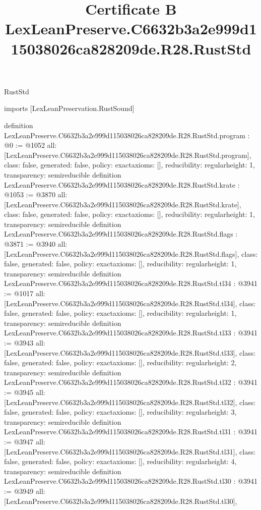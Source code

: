 \begin{lexlean}{RustStd}
\title{Certificate B LexLeanPreserve.C6632b3a2e999d115038026ca828209de.R28.RustStd}
\begin{coremodule}
imports [LexLeanPreservation.RustSound]

definition LexLeanPreserve.C6632b3a2e999d115038026ca828209de.R28.RustStd.program : @0 := @1052 {
  all: [LexLeanPreserve.C6632b3a2e999d115038026ca828209de.R28.RustStd.program],
  class: false,
  generated: false,
  policy: exact{axioms: []},
  reducibility: regular{height: 1},
  transparency: semireducible
}
definition LexLeanPreserve.C6632b3a2e999d115038026ca828209de.R28.RustStd.krate : @1053 := @3870 {
  all: [LexLeanPreserve.C6632b3a2e999d115038026ca828209de.R28.RustStd.krate],
  class: false,
  generated: false,
  policy: exact{axioms: []},
  reducibility: regular{height: 1},
  transparency: semireducible
}
definition LexLeanPreserve.C6632b3a2e999d115038026ca828209de.R28.RustStd.flags : @3871 := @3940 {
  all: [LexLeanPreserve.C6632b3a2e999d115038026ca828209de.R28.RustStd.flags],
  class: false,
  generated: false,
  policy: exact{axioms: []},
  reducibility: regular{height: 1},
  transparency: semireducible
}
definition LexLeanPreserve.C6632b3a2e999d115038026ca828209de.R28.RustStd.tl34 : @3941 := @1017 {
  all: [LexLeanPreserve.C6632b3a2e999d115038026ca828209de.R28.RustStd.tl34],
  class: false,
  generated: false,
  policy: exact{axioms: []},
  reducibility: regular{height: 1},
  transparency: semireducible
}
definition LexLeanPreserve.C6632b3a2e999d115038026ca828209de.R28.RustStd.tl33 : @3941 := @3943 {
  all: [LexLeanPreserve.C6632b3a2e999d115038026ca828209de.R28.RustStd.tl33],
  class: false,
  generated: false,
  policy: exact{axioms: []},
  reducibility: regular{height: 2},
  transparency: semireducible
}
definition LexLeanPreserve.C6632b3a2e999d115038026ca828209de.R28.RustStd.tl32 : @3941 := @3945 {
  all: [LexLeanPreserve.C6632b3a2e999d115038026ca828209de.R28.RustStd.tl32],
  class: false,
  generated: false,
  policy: exact{axioms: []},
  reducibility: regular{height: 3},
  transparency: semireducible
}
definition LexLeanPreserve.C6632b3a2e999d115038026ca828209de.R28.RustStd.tl31 : @3941 := @3947 {
  all: [LexLeanPreserve.C6632b3a2e999d115038026ca828209de.R28.RustStd.tl31],
  class: false,
  generated: false,
  policy: exact{axioms: []},
  reducibility: regular{height: 4},
  transparency: semireducible
}
definition LexLeanPreserve.C6632b3a2e999d115038026ca828209de.R28.RustStd.tl30 : @3941 := @3949 {
  all: [LexLeanPreserve.C6632b3a2e999d115038026ca828209de.R28.RustStd.tl30],
}
\end{coremodule}
\end{lexlean}
